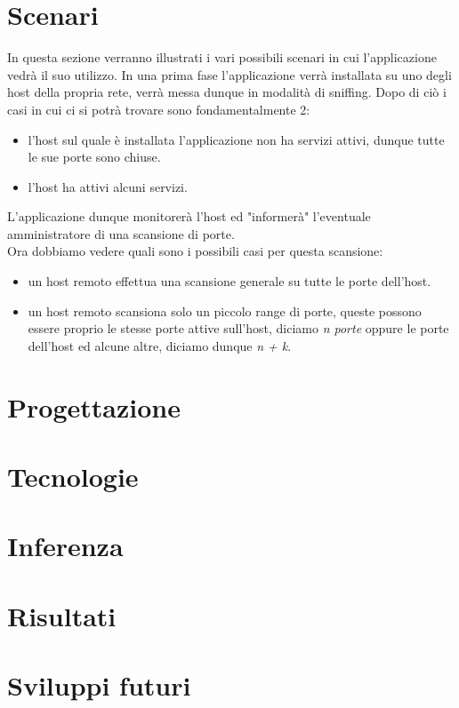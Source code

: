 \documentclass[a4paper,12pt]{article} %
\begin{document}
\section{Scenari}

In questa sezione verranno illustrati i vari possibili scenari in cui l'applicazione vedrà il suo utilizzo. 
In una prima fase l'applicazione verrà installata su uno degli host della propria rete, verrà messa dunque in modalità di sniffing. 
Dopo di ciò i casi in cui ci si potrà trovare sono fondamentalmente 2:

\begin{itemize}

\item l'host sul quale è installata l'applicazione non ha servizi attivi, dunque tutte le sue porte sono chiuse.

\item l'host ha attivi alcuni servizi.

\end{itemize}


L'applicazione dunque monitorerà l'host ed "informerà" l'eventuale amministratore di una scansione di porte.\\
Ora dobbiamo vedere quali sono i possibili casi per questa scansione:


\begin{itemize}

\item un host remoto effettua una scansione generale su tutte le porte dell'host.

\item un host remoto scansiona solo un piccolo range di porte, queste possono essere proprio le stesse porte attive sull'host, diciamo 
\emph{n porte} oppure le porte dell'host ed alcune altre, diciamo dunque \emph{n + k}.

\end{itemize}





\section{Progettazione}









\section{Tecnologie}


\section{Inferenza}


\section{Risultati}



\section{Sviluppi futuri}
\end{document}
